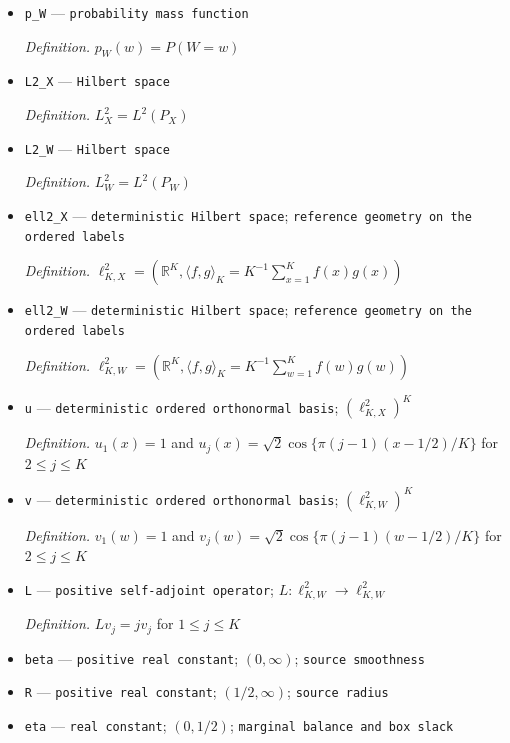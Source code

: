 \documentclass{article}
\begin{document}
\begin{itemize}
  \par\smallskip\noindent\emph{Definition.} \(p_X(x)=P(X=x)\)
  \item \texttt{p\_\allowbreak{}W} --- \texttt{probability mass function}
  \par\smallskip\noindent\emph{Definition.} \(p_W(w)=P(W=w)\)
  \item \texttt{L2\_\allowbreak{}X} --- \texttt{Hilbert space}
  \par\smallskip\noindent\emph{Definition.} \(L^2_X=L^2(P_X)\)
  \item \texttt{L2\_\allowbreak{}W} --- \texttt{Hilbert space}
  \par\smallskip\noindent\emph{Definition.} \(L^2_W=L^2(P_W)\)
  \item \texttt{ell2\_\allowbreak{}X} --- \texttt{deterministic Hilbert space}; \texttt{reference geometry on the ordered labels}
  \par\smallskip\noindent\emph{Definition.} \(\ell^2_{K,X}=(\mathbb R^K,\langle f,g\rangle_{K}=K^{-1}\sum_{x=1}^K f(x)g(x))\)
  \item \texttt{ell2\_\allowbreak{}W} --- \texttt{deterministic Hilbert space}; \texttt{reference geometry on the ordered labels}
  \par\smallskip\noindent\emph{Definition.} \(\ell^2_{K,W}=(\mathbb R^K,\langle f,g\rangle_{K}=K^{-1}\sum_{w=1}^K f(w)g(w))\)
  \item \texttt{u} --- \texttt{deterministic ordered orthonormal basis}; \((\ell^2_{K,X})^K\)
  \par\smallskip\noindent\emph{Definition.} \(u_1(x)=1\) and \(u_j(x)=\sqrt2\cos\{\pi(j-1)(x-1/2)/K\}\) for \(2\le j\le K\)
  \item \texttt{v} --- \texttt{deterministic ordered orthonormal basis}; \((\ell^2_{K,W})^K\)
  \par\smallskip\noindent\emph{Definition.} \(v_1(w)=1\) and \(v_j(w)=\sqrt2\cos\{\pi(j-1)(w-1/2)/K\}\) for \(2\le j\le K\)
  \item \texttt{L} --- \texttt{positive self-\allowbreak{}adjoint operator}; \(L:\ell^2_{K,W}\to \ell^2_{K,W}\)
  \par\smallskip\noindent\emph{Definition.} \(Lv_j=jv_j\) for \(1\le j\le K\)
  \item \texttt{beta} --- \texttt{positive real constant}; \((0,\infty)\); \texttt{source smoothness}
  \item \texttt{R} --- \texttt{positive real constant}; \((1/2,\infty)\); \texttt{source radius}
  \item \texttt{eta} --- \texttt{real constant}; \((0,1/2)\); \texttt{marginal balance and box slack}

\end{itemize}
\end{document}
